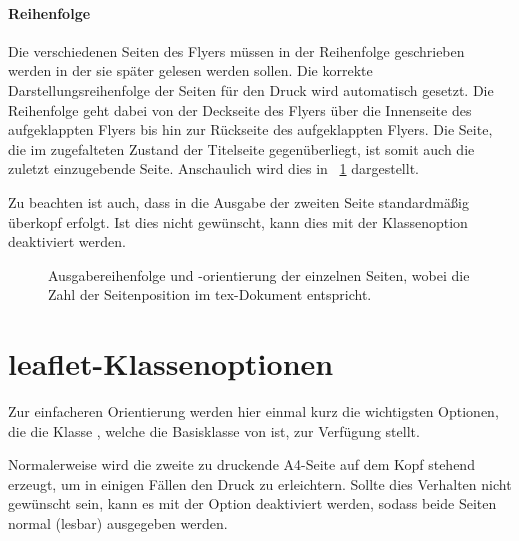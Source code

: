 \paragraph{Reihenfolge}\hfill

Die verschiedenen Seiten des Flyers müssen in der Reihenfolge
geschrieben werden in der sie später gelesen werden sollen.
Die korrekte Darstellungsreihenfolge der Seiten für den Druck
wird automatisch gesetzt.
Die Reihenfolge geht dabei von der Deckseite des Flyers
über die Innenseite des aufgeklappten Flyers bis hin zur Rückseite
des aufgeklappten Flyers.
Die Seite, die im zugefalteten Zustand der Titelseite gegenüberliegt,
ist somit auch die zuletzt einzugebende Seite. Anschaulich wird dies
in \figurename~\ref{fig:leaflet:pageorder} dargestellt.

Zu beachten ist auch, dass in  die Ausgabe der zweiten 
Seite standardmäßig überkopf erfolgt.
Ist dies nicht gewünscht, kann dies mit der Klassenoption
 deaktiviert werden.

\begin{figure}[!ht]
\begin{minipage}{0.475\textwidth}
%
\end{minipage}%
\hfill
\begin{minipage}{0.475\textwidth}
%
\end{minipage}
\caption{Ausgabereihenfolge und -orientierung der einzelnen Seiten, wobei 
die Zahl der Seitenposition im tex-Dokument entspricht.}
\label{fig:leaflet:pageorder}
\end{figure}

\section{leaflet-Klassenoptionen}

Zur einfacheren Orientierung werden hier einmal kurz die wichtigsten Optionen,
die die Klasse , welche die Basisklasse von 
ist, zur Verfügung stellt.

\begin{Declaration}
\end{Declaration}
Normalerweise wird die zweite zu druckende A4-Seite auf dem Kopf stehend erzeugt,
um in einigen Fällen den Druck zu erleichtern.
Sollte dies Verhalten nicht gewünscht sein, kann es mit der Option
 deaktiviert werden, sodass beide Seiten normal (lesbar)
ausgegeben werden.

